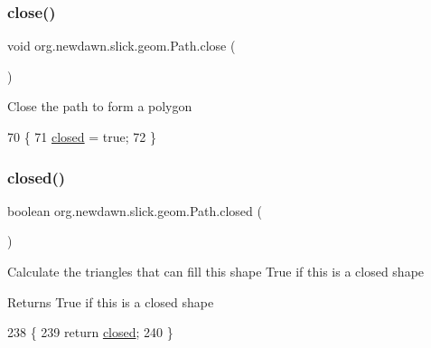 \subsubsection{\texorpdfstring{close()}{close()}}
{\footnotesize\ttfamily void org.\+newdawn.\+slick.\+geom.\+Path.\+close (\begin{DoxyParamCaption}{ }\end{DoxyParamCaption})\hspace{0.3cm}{\ttfamily [inline]}}

Close the path to form a polygon 
\begin{DoxyCode}
70                         \{
71         \mbox{\hyperlink{classorg_1_1newdawn_1_1slick_1_1geom_1_1_path_a237262eda546795e1ff49f4d8da5c383}{closed}} = \textcolor{keyword}{true};
72     \}
\end{DoxyCode}
\mbox{\label{classorg_1_1newdawn_1_1slick_1_1geom_1_1_path_a237262eda546795e1ff49f4d8da5c383}} 
\subsubsection{\texorpdfstring{closed()}{closed()}}
{\footnotesize\ttfamily boolean org.\+newdawn.\+slick.\+geom.\+Path.\+closed (\begin{DoxyParamCaption}{ }\end{DoxyParamCaption})\hspace{0.3cm}{\ttfamily [inline]}}

Calculate the triangles that can fill this shape True if this is a closed shape

\begin{DoxyReturn}{Returns}
True if this is a closed shape 
\end{DoxyReturn}

\begin{DoxyCode}
238                             \{
239         \textcolor{keywordflow}{return} \mbox{\hyperlink{classorg_1_1newdawn_1_1slick_1_1geom_1_1_path_a237262eda546795e1ff49f4d8da5c383}{closed}};
240     \}
\end{DoxyCode}
\mbox{\label{classorg_1_1newdawn_1_1slick_1_1geom_1_1_path_ade98d8658a21b9e18b03977a91ef21ae}} 
